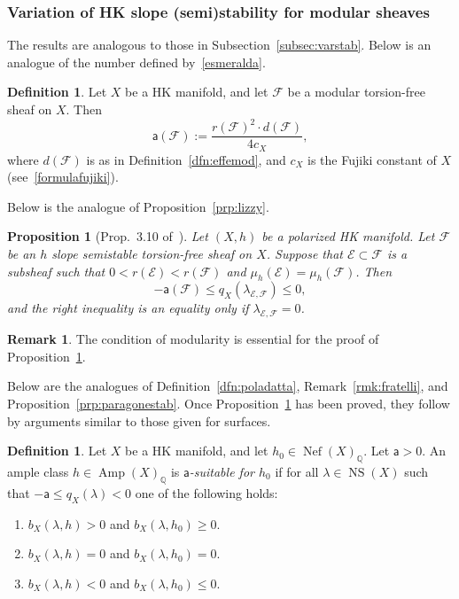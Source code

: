 \documentclass[11pt]{amsart}
\newcommand{\QQ}{{\mathbb Q}}
\let\mathcal\mathscr
\def\cE{\mathcal{E}}
\def\cF{\mathcal{F}}
\DeclareMathOperator{\Amp}{Amp}
\DeclareMathOperator{\Nef}{Nef}
\DeclareMathOperator{\NS}{NS}
\newtheorem{prp}[lmm]{Proposition}
\theoremstyle{definition}
\newtheorem{dfn}[lmm]{Definition}
\newtheorem{rmk}[lmm]{Remark}
\theoremstyle{remark}
\begin{document}
\subsubsection{Variation of HK slope (semi)stability for modular sheaves}
%
The results are  analogous to those in Subsection~\ref{subsec:varstab}. Below is an analogue of the number defined by~\eqref{esmeralda}.
%
\begin{dfn}\label{dfn:adieffe}
%
Let $X$ be a HK manifold, and let $\cF$ be a modular torsion-free sheaf  on $X$.
Then
%
\begin{equation}\label{larissa}
%
{\mathsf a}(\cF):=\frac{r(\cF)^2 \cdot d(\cF) }{4c_X},
%
\end{equation}
%
where $d(\cF)$ is as in Definition~\ref{dfn:effemod}, and $c_X$ is the Fujiki constant of $X$ (see~\eqref{formulafujiki}).
%
\end{dfn}
%
Below is the analogue of Proposition~\ref{prp:lizzy}.
%
\begin{prp}[Prop.~3.10 of~\cite{og:fascimod}]\label{prp:lizzydue}
%
Let $(X,h)$ be a polarized HK manifold. Let $\cF$ be an $h$ slope semistable   torsion-free sheaf  on $X$. Suppose that $\cE\subset\cF$ is a subsheaf such that $0<r(\cE)<r(\cF)$ and $\mu_h(\cE)=\mu_h(\cF)$. Then 
%
\begin{equation*}
%
-{\mathsf a}(\cF)\le q_X(\lambda_{\cE,\cF})\le 0,
%
\end{equation*}
%
and the right inequality is an equality  only if $\lambda_{\cE,\cF}=0$.
%
\end{prp}
%
%
\begin{rmk}
%
 The condition of modularity is essential  for the proof of Proposition~\ref{prp:lizzydue}.
%
\end{rmk}
%
Below are the analogues of Definition~\ref{dfn:poladatta}, Remark~\ref{rmk:fratelli}, and Proposition~\ref{prp:paragonestab}. Once 
Proposition~\ref{prp:lizzydue} has been proved, they follow by arguments similar to those given for surfaces.
%
\begin{dfn}\label{dfn:helen}
%
Let $X$ be a HK manifold, and let  $h_0\in\Nef(X)_{\QQ}$. 
Let  ${\mathsf a}> 0$. An ample class $h\in\Amp(X)_{\QQ}$ is \emph{${\mathsf a}$-suitable for $h_0$}  if  for all
 $\lambda\in \NS(X)$  such that $ -{\mathsf a}\le q_X(\lambda)<0$ one of the following holds:
%
\begin{enumerate}
%
\item
%
$b_X(\lambda,h)>0$ and $b_X(\lambda,h_0)\ge 0$.
%
\item
%
 $b_X(\lambda,h)=0$  and $b_X(\lambda,h_0)= 0$.
%
\item
%
 $b_X(\lambda,h)<0$  and $b_X(\lambda,h_0)\le 0$.
%
\end{enumerate}
%
%
\end{dfn}
%
\end{document}
